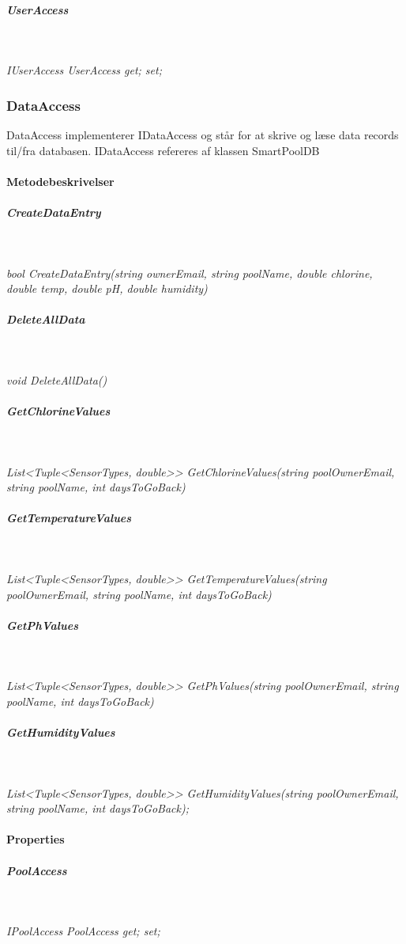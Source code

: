 \subparagraph{UserAccess}\

\textit{IUserAccess UserAccess { get; set; }}


\subsubsection{DataAccess}
DataAccess implementerer IDataAccess og står for at skrive og læse data records til/fra databasen.
IDataAccess refereres af klassen SmartPoolDB



\paragraph{Metodebeskrivelser}

\subparagraph{CreateDataEntry}\

\textit{bool CreateDataEntry(string ownerEmail, string poolName, double chlorine, double temp, double pH, double humidity)}


\subparagraph{DeleteAllData}\

\textit{void DeleteAllData()}

\subparagraph{GetChlorineValues}\

\textit{List<Tuple<SensorTypes, double>> GetChlorineValues(string poolOwnerEmail, string poolName, int daysToGoBack)}

\subparagraph{GetTemperatureValues}\

\textit{List<Tuple<SensorTypes, double>> GetTemperatureValues(string poolOwnerEmail, string poolName, int daysToGoBack)}

\subparagraph{GetPhValues}\

\textit{List<Tuple<SensorTypes, double>> GetPhValues(string poolOwnerEmail, string poolName, int daysToGoBack)}

\subparagraph{GetHumidityValues}\

\textit{List<Tuple<SensorTypes, double>> GetHumidityValues(string poolOwnerEmail, string poolName, int daysToGoBack);}

\paragraph{Properties}

\subparagraph{PoolAccess}\

\textit{IPoolAccess PoolAccess { get; set; }}

